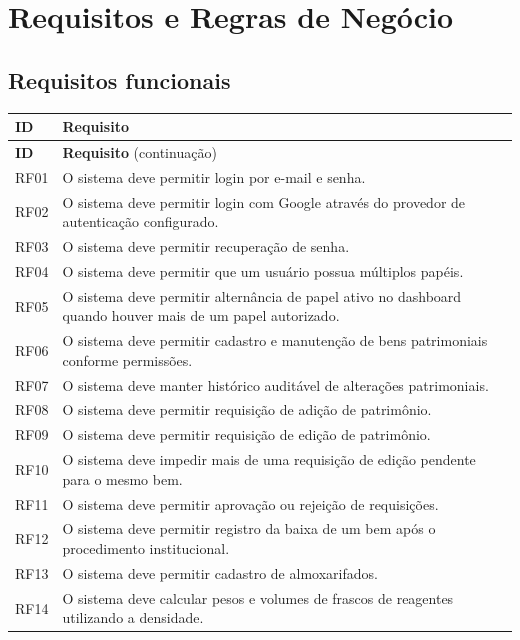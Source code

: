 \section{Requisitos e Regras de Negócio}

\subsection{Requisitos funcionais}


\setlength{\tabcolsep}{5pt}
\begin{longtable}{p{} p{}}
\toprule
\textbf{ID} & \textbf{Requisito}\\
\midrule
\endfirsthead
\toprule
\textbf{ID} & \textbf{Requisito} (continuação)\\
\midrule
\endhead
\bottomrule
\endfoot
RF01 & O sistema deve permitir login por e-mail e senha.\\
RF02 & O sistema deve permitir login com Google através do provedor de autenticação configurado.\\
RF03 & O sistema deve permitir recuperação de senha.\\
RF04 & O sistema deve permitir que um usuário possua múltiplos papéis.\\
RF05 & O sistema deve permitir alternância de papel ativo no dashboard quando houver mais de um papel autorizado.\\
RF06 & O sistema deve permitir cadastro e manutenção de bens patrimoniais conforme permissões.\\
RF07 & O sistema deve manter histórico auditável de alterações patrimoniais.\\
RF08 & O sistema deve permitir requisição de adição de patrimônio.\\
RF09 & O sistema deve permitir requisição de edição de patrimônio.\\
RF10 & O sistema deve impedir mais de uma requisição de edição pendente para o mesmo bem.\\
RF11 & O sistema deve permitir aprovação ou rejeição de requisições.\\
RF12 & O sistema deve permitir registro da baixa de um bem após o procedimento institucional.\\
RF13 & O sistema deve permitir cadastro de almoxarifados.\\
RF14 & O sistema deve calcular pesos e volumes de frascos de reagentes utilizando a densidade.\\

\end{longtable}
